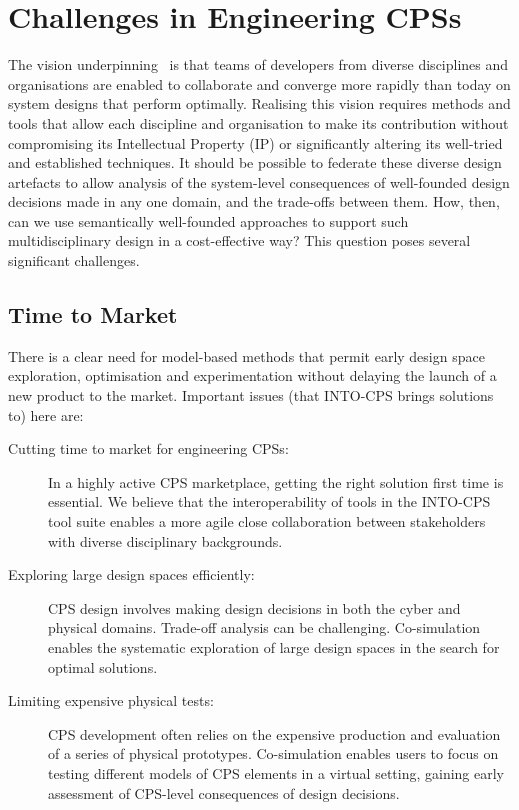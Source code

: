 \section{Challenges in Engineering CPSs}\label{sec:challenges}


The vision underpinning \into\ is that teams of developers from diverse disciplines and organisations are enabled to collaborate and converge more rapidly than today on system designs that perform optimally. Realising this vision requires methods and tools that allow each discipline and organisation to make its contribution without compromising its Intellectual Property (IP) or significantly altering its well-tried and established techniques. It should be possible to federate these diverse design artefacts to allow analy\-sis of the system-level consequences of well-founded design decisions made in any one domain, and the trade-offs between them. How, then, can we use semantically well-founded approaches to support such multidisciplinary design in a cost-effective way? This question poses several significant challenges. 

\subsection{Time to Market}

There is a clear need for model-based methods that permit early design space exploration, optimisation and experimentation without delaying the launch of a new product to the market. Important issues (that INTO-CPS brings solutions to) here are:

\begin{description}
\item[Cutting time to market for engineering CPSs:] In a highly active CPS marketplace, getting the right solution first time is essential. We believe that the interoperability of tools in the INTO-CPS tool suite enables a more agile close collaboration between stakeholders with diverse disciplinary backgrounds.
\item[Exploring large design spaces efficiently:] CPS design involves making design decisions in both the cyber and physical domains. Trade-off analysis can be challenging. Co-simulation enables the systematic exploration of large design spaces in the search for optimal solutions.
\item[Limiting expensive physical tests:] CPS development often relies on the expensive production and evaluation of a series of physical prototypes. Co-simulation enables users to focus on testing different models of CPS elements in a virtual setting, gaining early assessment of CPS-level consequences of design decisions.
\end{description}

